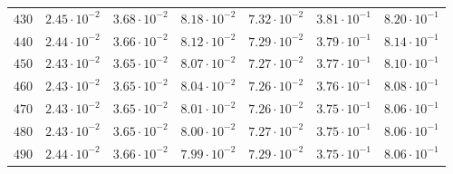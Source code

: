 \begin{table}[h]
\begin{tabular}{lcccccc}
$	430	$ & $	2.45 \cdot 10^{-2}	$ & $	3.68 \cdot 10^{-2}	$ & $	8.18 \cdot 10^{-2}	$ & $	7.32 \cdot 10^{-2}	$ & $	3.81 \cdot 10^{-1}	$ & $	8.20 \cdot 10^{-1}	$ \\
$	440	$ & $	2.44 \cdot 10^{-2}	$ & $	3.66 \cdot 10^{-2}	$ & $	8.12 \cdot 10^{-2}	$ & $	7.29 \cdot 10^{-2}	$ & $	3.79 \cdot 10^{-1}	$ & $	8.14 \cdot 10^{-1}	$ \\
$	450	$ & $	2.43 \cdot 10^{-2}	$ & $	3.65 \cdot 10^{-2}	$ & $	8.07 \cdot 10^{-2}	$ & $	7.27 \cdot 10^{-2}	$ & $	3.77 \cdot 10^{-1}	$ & $	8.10 \cdot 10^{-1}	$ \\
$	460	$ & $	2.43 \cdot 10^{-2}	$ & $	3.65 \cdot 10^{-2}	$ & $	8.04 \cdot 10^{-2}	$ & $	7.26 \cdot 10^{-2}	$ & $	3.76 \cdot 10^{-1}	$ & $	8.08 \cdot 10^{-1}	$ \\
$	470	$ & $	2.43 \cdot 10^{-2}	$ & $	3.65 \cdot 10^{-2}	$ & $	8.01 \cdot 10^{-2}	$ & $	7.26 \cdot 10^{-2}	$ & $	3.75 \cdot 10^{-1}	$ & $	8.06 \cdot 10^{-1}	$ \\
$	480	$ & $	2.43 \cdot 10^{-2}	$ & $	3.65 \cdot 10^{-2}	$ & $	8.00 \cdot 10^{-2}	$ & $	7.27 \cdot 10^{-2}	$ & $	3.75 \cdot 10^{-1}	$ & $	8.06 \cdot 10^{-1}	$ \\
$	490	$ & $	2.44 \cdot 10^{-2}	$ & $	3.66 \cdot 10^{-2}	$ & $	7.99 \cdot 10^{-2}	$ & $	7.29 \cdot 10^{-2}	$ & $	3.75 \cdot 10^{-1}	$ & $	8.06 \cdot 10^{-1}	$ \\
\hline
  \end{tabular}
  \end{table}

